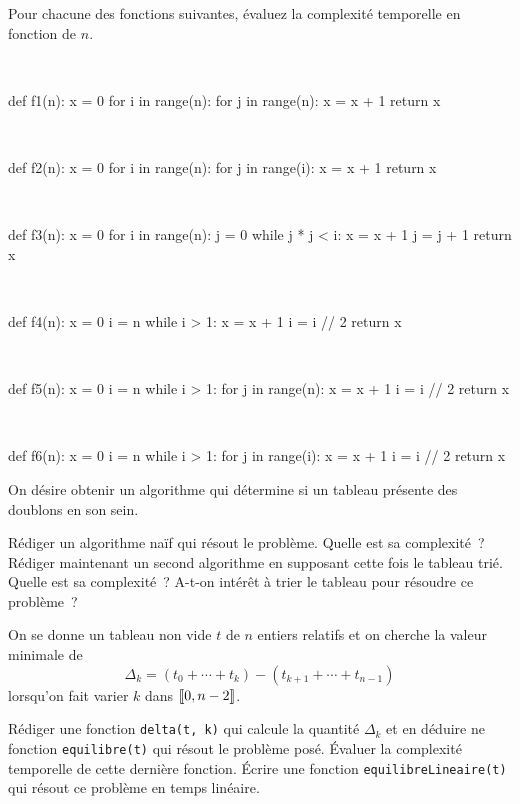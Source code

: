 \documentclass{magnoliaold}
\begin{document}
Pour chacune des fonctions suivantes, évaluez la complexité temporelle en fonction de $n$.
\begin{questions}
\question $\ $
\begin{pythoncode}
def f1(n):
    x = 0
    for i in range(n):
        for j in range(n):
            x = x + 1
    return x
\end{pythoncode}
\question $\ $
\begin{pythoncode}
def f2(n):
    x = 0
    for i in range(n):
        for j in range(i):
            x = x + 1
    return x
\end{pythoncode}
\question $\ $
\begin{pythoncode}
def f3(n):
    x = 0
    for i in range(n):
        j = 0
        while j * j < i:
            x = x + 1
            j = j + 1
    return x
\end{pythoncode}
\question $\ $
\begin{pythoncode}
def f4(n):
    x = 0
    i = n
    while i > 1:
        x = x + 1
        i = i // 2
    return x
\end{pythoncode}
\question $\ $
\begin{pythoncode}
def f5(n):
    x = 0
    i = n
    while i > 1:
        for j in range(n):
            x = x + 1
        i = i // 2
    return x
\end{pythoncode}
\question $\ $
\begin{pythoncode}
def f6(n):
    x = 0
    i = n
    while i > 1:
        for j in range(i):
            x = x + 1
        i = i // 2
    return x
\end{pythoncode}
\end{questions}

On désire obtenir un algorithme qui détermine si un tableau présente des doublons en son sein.
\begin{questions}
\question Rédiger un algorithme naïf qui résout le problème. Quelle est sa complexité~?
\question Rédiger maintenant un second algorithme en supposant cette fois le tableau trié.
  Quelle est sa complexité~? A-t-on intérêt à trier le tableau pour résoudre ce problème~?
\end{questions}

On se donne un tableau non vide $t$ de $n$ entiers relatifs et on cherche la valeur minimale
de
\[\Delta_k=(t_0+\cdots+t_k)-(t_{k+1}+\cdots+t_{n-1})\]
lorsqu'on fait varier $k$ dans $\left\llbracket 0,n-2\right\rrbracket$.
\begin{questions}
\question Rédiger une fonction \verb!delta(t, k)! qui calcule la quantité $\Delta_k$ et en
  déduire ne fonction \verb!equilibre(t)! qui résout le problème posé. Évaluer la
	complexité temporelle de cette dernière fonction.
\question Écrire une fonction \verb!equilibreLineaire(t)! qui résout ce problème en temps
  linéaire.
\end{questions}
\end{document}
